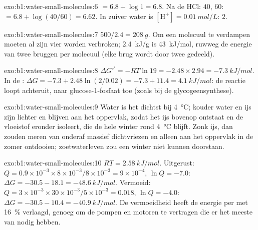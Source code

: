 \begin{solution}{exo:b1:water-small-molecules:6}
 $= 6.8 + \log 1 = 6.8$. Na de HCl:  $40$,  $60$:  $= 6.8 +
\log(40/60) = 6.62$. In zuiver water is $[\mathrm{H^+}] = \qty{0.01}{mol/L}$:
 $2$.
\end{solution}

\begin{solution}{exo:b1:water-small-molecules:7}
$500/2.4 = \qty{208}{g}$. Om een molecuul te verdampen moeten al zijn vier
 worden verbroken; \qty{2.4}{kJ/g} is \qty{43}{kJ/mol}, ruwweg de
energie van twee bruggen per molecuul (elke brug wordt door twee gedeeld).
\end{solution}

\begin{solution}{exo:b1:water-small-molecules:8}
$\Delta G^{\circ\prime} = -RT\ln 19 = -2.48\times 2.94 =
\qty{-7.3}{kJ/mol}$. In de : $\Delta G = -7.3 + 2.48\ln(2/0.02) =
-7.3 + 11.4 = \qty{+4.1}{kJ/mol}$: de reactie loopt achteruit, naar
glucose-1-fosfaat toe (zoals bij de glycogeensynthese).
\end{solution}

\begin{solution}{exo:b1:water-small-molecules:9}
Water is het dichtst bij \qty{4}{\celsius}; kouder water en ijs zijn lichter en
blijven aan het oppervlak, zodat het ijs bovenop ontstaat en de vloeistof
eronder isoleert, die de hele winter rond \qty{4}{\celsius} blijft. Zonk ijs, dan
zouden meren van onderaf massief dichtvriezen en alleen aan het oppervlak in de
zomer ontdooien; zoetwaterleven zou een winter niet kunnen doorstaan.
\end{solution}

\begin{solution}{exo:b1:water-small-molecules:10}
$RT = \qty{2.58}{kJ/mol}$. Uitgerust: $Q = 0.9\times 10^{-3}\times 8\times
10^{-3}/8\times 10^{-3} = 9\times 10^{-4}$, $\ln Q = -7.0$: $\Delta G =
-30.5 - 18.1 = \qty{-48.6}{kJ/mol}$. Vermoeid: $Q = 3\times 10^{-3}\times
30\times 10^{-3}/5\times 10^{-3} = 0.018$, $\ln Q = -4.0$: $\Delta G =
-30.5 - 10.4 = \qty{-40.9}{kJ/mol}$. De vermoeidheid heeft de energie per  met
\qty{16}{\%} verlaagd, genoeg om de pompen en motoren te vertragen die er het
meeste van nodig hebben.
\end{solution}

